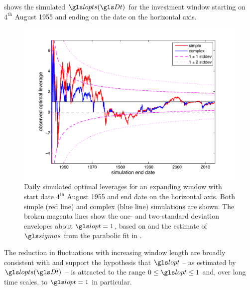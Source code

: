  shows the simulated $\lopts(\Dt)$ for the investment window starting on $4^\text{th}$ August 1955 and ending on the date on the horizontal axis.
\begin{figure}
\includegraphics[width=\textwidth]{./chapter_4/figs/sme_fig4.pdf}
\caption{Daily simulated optimal leverages for an expanding window with start date $4^\text{th}$ August 1955 and end date on the horizontal axis. Both simple (red line) and complex (blue line) simulations are shown. The broken magenta lines show the one- and two-standard deviation envelopes about $\lopt=1$, based on  and the estimate of $\sigmas$ from the parabolic fit in .}
\end{figure}
The reduction in fluctuations with increasing window length are broadly consistent with  and support the hypothesis that $\lopt$ -- as estimated by $\lopts(\Dt)$ -- is attracted to the range $0\leq\lopt\leq1$ and, over long time scales, to $\lopt=1$ in particular.

